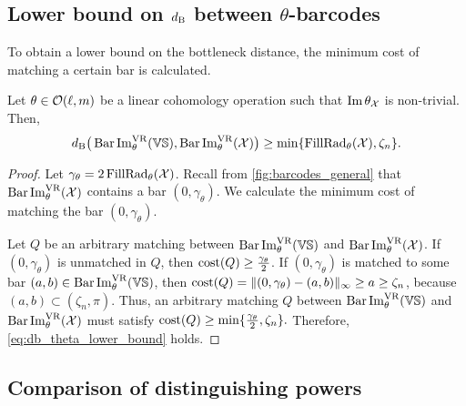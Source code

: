 
\subsection{Lower bound on $d_{\mathrm{B}}$ between $\theta$-barcodes}
\label{subsub:db_theta_lower_bound}

To obtain a lower bound on the bottleneck distance, the minimum cost of matching a certain bar is calculated.

\medskip\proposition
Let $\theta \in \mathcal{O}(\ell, m)$ be a linear cohomology operation such that $\operatorname{Im} \theta_{\mathcal{X}}$ is non-trivial.
Then,
\begin{equation}\label{eq:db_theta_lower_bound}
	\db\big(\thetabarc{\VS}, \thetabarc{\cX}\big)
	\geq \min\{\firstdeath{\theta}{\cX}, \zeta_n\}. %
\end{equation}

\begin{proof}
    Let $\gamma_\theta = 2\operatorname{FillRad}_{\theta}(\mathcal{X})$.
	Recall from \cref{fig:barcodes_general} that $\operatorname{Bar}\operatorname{Im}_{\theta}^{\mathrm{VR}} (\mathcal{X})$ contains a bar $(0,\gamma_\theta)$.
	We calculate the minimum cost of matching the bar $(0,\gamma_\theta)$.

	Let $Q$ be an arbitrary matching between $\operatorname{Bar}\operatorname{Im}_{\theta}^{\mathrm{VR}} (\mathbb{V}\mathbb{S})$ and $\operatorname{Bar}\operatorname{Im}_{\theta}^{\mathrm{VR}} (\mathcal{X})$.
	If $(0,\gamma_\theta )$ is unmatched in $Q$, then $\mathrm{cost}(Q) \geq \tfrac{\gamma_\theta }{2}$.
	If $(0,\gamma_\theta )$ is matched to some bar $(a,b) \in \operatorname{Bar}\operatorname{Im}_{\theta}^{\mathrm{VR}} (\mathbb{V}\mathbb{S})$, then
	$\mathrm{cost}(Q) =  \|(0,\gamma_\theta ) - (a,b)\|_\infty \geq a \geq \zeta_n$, because $(a,b) \subset (\zeta_n, \pi)$.
	Thus, an arbitrary matching $Q$ between $\operatorname{Bar}\operatorname{Im}_{\theta}^{\mathrm{VR}} (\mathbb{V}\mathbb{S})$ and $\operatorname{Bar}\operatorname{Im}_{\theta}^{\mathrm{VR}} (\mathcal{X})$ must satisfy $\mathrm{cost}(Q) \geq \min\{\tfrac{\gamma_\theta }{2}, \zeta_n\}.$
	Therefore, \cref{eq:db_theta_lower_bound} holds.
\end{proof}

\subsection{Comparison of distinguishing powers}
\label{subsub:main_theorem}

\subsubsection{}
\label{subsub:comparison_lemma}

